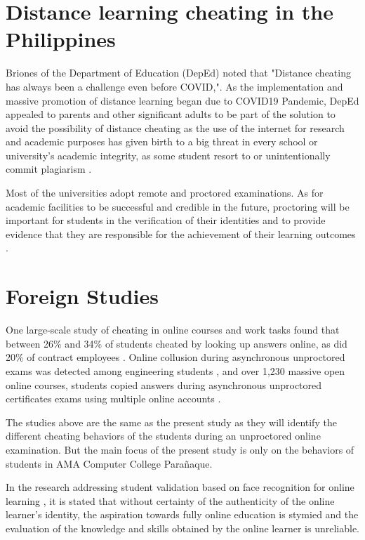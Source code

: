 \section*{Distance learning cheating in the Philippines}

Briones of the Department of Education (DepEd) noted that "Distance cheating has always been a challenge even before COVID,".
As the implementation and massive promotion of distance learning began due to COVID19 Pandemic, DepEd appealed to parents and other significant adults to be part of the solution to avoid the possibility of distance cheating as the use of the internet for research and academic purposes has given birth to a big threat in every school or university's academic integrity, as some student resort to or unintentionally commit plagiarism \cite{quieta2020plagiarism}.

Most of the universities adopt remote and proctored examinations. As for academic facilities to be successful and credible in the future, proctoring will be important for students in the verification of their identities and to provide evidence that they are responsible for the achievement of their learning outcomes \cite{dela2015massive}.

\section{Foreign Studies}

One large-scale study of cheating in online courses and work tasks found that between 26\% and 34\% of students cheated by looking up answers online, as did 20\% of contract employees \cite{corrigan2015deterring}.
Online collusion during asynchronous unproctored exams was detected among engineering students \cite{de2015calculated}, and over 1,230 massive open online courses, students copied answers during asynchronous unproctored certificates exams using multiple online accounts \cite{northcutt2016detecting}.

The studies above are the same as the present study as they will identify the different cheating behaviors of the students during an unproctored online examination.
But the main focus of the present study is only on the behaviors of students in AMA Computer College Parañaque.

In the research addressing student validation based on face recognition for online learning \cite{labayen2014smowl}, it is stated that without certainty of the authenticity of the online learner's identity, the aspiration towards fully online education is stymied and the evaluation of the knowledge and skills obtained by the online learner is unreliable.

